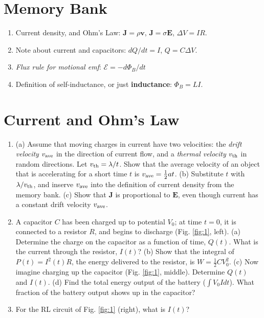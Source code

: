 \documentclass[12pt]{article}
\begin{document}
\small
\maketitle
\section{Memory Bank}
\begin{enumerate}
\item Current density, and Ohm's Law: $\mathbf{J} = \rho \mathbf{v}$, $\mathbf{J} = \sigma \mathbf{E}$, $\Delta V = I R$.
\item Note about current and capacitors: $dQ/dt = I$, $Q = C\Delta V$.
\item \textit{Flux rule for motional emf}: $\mathcal{E} = - d\Phi_B/dt$
\item Definition of self-inductance, or just \textbf{inductance}: $\Phi_B = L I$.
\end{enumerate}

\section{Current and Ohm's Law}

\begin{enumerate}
\item (a) Assume that moving charges in current have two velocities: the \textit{drift velocity} $v_{\rm ave}$ in the direction of current flow, and a \textit{thermal velocity} $v_{\rm th}$ in random directions.  Let $v_{\rm th} = \lambda/t$.  Show that the average velocity of an object that is accelerating for a short time $t$ is $v_{\rm ave} = \frac{1}{2}at$. (b) Substitute $t$ with $\lambda/v_{\rm th}$, and inserve $v_{\rm ave}$ into the definition of current density from the memory bank. (c) Show that $\mathbf{J}$ is proportional to $\mathbf{E}$, even though current has a constant drift velocity $v_{\rm ave}$. \\ \vspace{1cm}
\item A capacitor $C$ has been charged up to potential $V_0$; at time $t = 0$, it is connected to a resistor $R$, and begins to discharge (Fig. \ref{fig:1}, left). (a) Determine the charge on the capacitor as a function of time, $Q(t)$.  What is the current through the resistor, $I(t)$? (b) Show that the integral of $P(t) = I^2(t)R$, the energy delivered to the resistor, is $W = \frac{1}{2}CV_0^2$. (c) Now imagine charging up the capacitor (Fig. \ref{fig:1}, middle).  Determine $Q(t)$ and $I(t)$. (d) Find the total energy output of the battery ($\int V_0 I dt$).  What fraction of the battery output shows up in the capacitor? \\ \vspace{2cm}
\item For the RL circuit of Fig. \ref{fig:1} (right), what is $I(t)$?
\end{enumerate}
\end{document}
